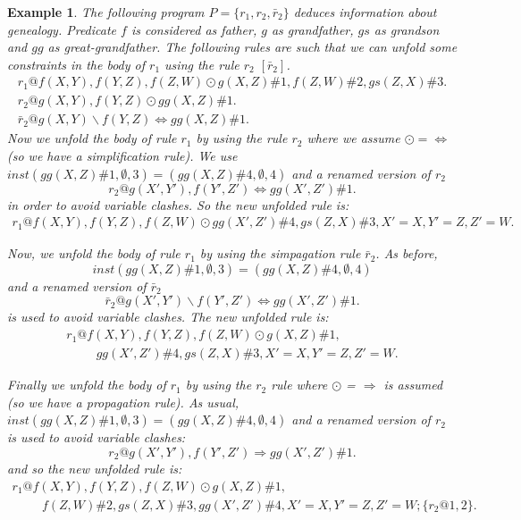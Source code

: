 \documentclass[final]{acmtrans2e}
\newtheorem{exa}[theorem]{Example}
\newenvironment{example}{\begin{exa}}{\end{exa}}
\begin{document}
\begin{example}\label{ex:gen_adam}
The following program $P=\{r_1, r_2, \bar r_2\}$  deduces
information  about genealogy. Predicate $f$ is considered as
father, $g$ as grandfather, $gs$ as grandson and $gg$ as
great-grandfather. The following rules are such that we can unfold
some constraints in the body of $r_1$ using the rule $r_2$ $[\bar
r_2]$.
$$
\begin{array}{l}
r_1@f(X, Y), f(Y, Z), f(Z, W)\odot g(X, Z)\#1,f(Z, W)\#2,gs(Z, X)\#3.\\
r_2@g(X, Y), f(Y, Z)\odot gg(X, Z)\#1.\\
\bar r_2@g(X, Y)\backslash f(Y, Z) \Leftrightarrow gg(X, Z)\#1.
\end{array}
$$
Now we  unfold the body of rule $r_1$ by using the rule
$r_2$ where we assume $\odot=\Leftrightarrow$ (so we have a simplification rule).  We use
$inst(gg(X,Z)\#1,\emptyset,3) = (gg(X,Z)\#4,\emptyset,4)$ and a renamed version of $r_2$
$$r_2@g(X', Y'), f(Y', Z') \Leftrightarrow gg(X', Z')\#1.$$
 in order to avoid variable clashes.
So the new unfolded rule is:
$$
\begin{array}{l}
r_1@f(X, Y),f(Y, Z), f(Z, W)\odot  gg(X', Z')\#4,
gs(Z,X)\#3, X'=X, Y'=Z, Z'=W.
\end{array}
$$

Now, we unfold the body of rule $r_1$ by using the simpagation
rule $\bar r_2$. As before,
\[inst(gg(X,Z)\#1,\emptyset,3) = (gg(X,Z)\#4,\emptyset,4)\] and a renamed version of $\bar
r_2$
$$\bar r_2@g(X', Y')\backslash f(Y', Z') \Leftrightarrow gg(X', Z')\#1.$$
is used to avoid variable clashes. The new unfolded rule is:
$$
\begin{array}{l}
r_1@f(X, Y),f(Y, Z), f(Z, W)\odot  g(X, Z)\#1,\\
\hspace{1cm} gg(X', Z')\#4,gs(Z,X)\#3, X'=X, Y'=Z, Z'=W.
\end{array}
$$


Finally we unfold the body of $r_1$ by using the $r_2$ rule where $\odot$ = $\Rightarrow$ is assumed (so we have a propagation rule).
As usual, $inst(gg(X,Z)\#1,\emptyset,3) = (gg(X,Z)\#4,\emptyset,4)$ and a renamed version of $r_2$ is used to avoid variable clashes:
$$r_2@g(X', Y'), f(Y', Z') \Rightarrow gg(X', Z')\#1.$$
and so the new unfolded rule is:
$$
\begin{array}{l}
r_1@f(X, Y),f(Y, Z), f(Z, W)\odot g(X, Z)\#1,\\
\hspace{1cm}f(Z, W)\#2, gs(Z, X)\#3, gg(X', Z')\#4, X'=X,
Y'=Z,Z'=W; \{r_2@1, 2\}.
\end{array}
$$
\end{example}
\end{document}
